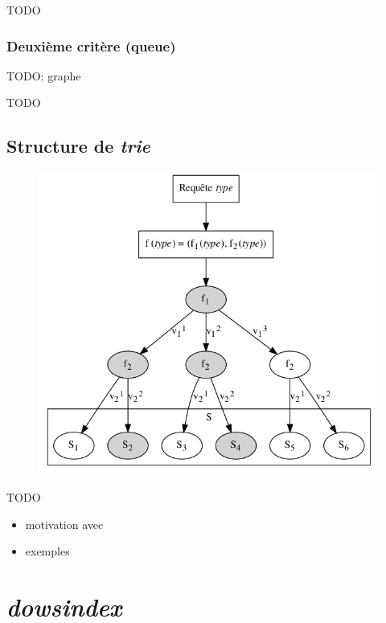 \documentclass [a4paper] {report}
\theoremstyle {definition}
\newcommand {\trie} {\textit {trie}}
\newcommand {\dowsindex} {\textit{dowsindex}\xspace}
\begin{document}
TODO

\subsection {Deuxième critère (queue)}

TODO: graphe

TODO

\section {Structure de \trie}

\begin {figure} [h]
\begin {center}
	\includegraphics [scale=0.3] {graphs/trie}
\end {center}
\end {figure}

TODO
\begin {itemize}
	\item motivation avec \cite {schulz}
	\item exemples
\end {itemize}


\chapter {\dowsindex}
\end{document}
